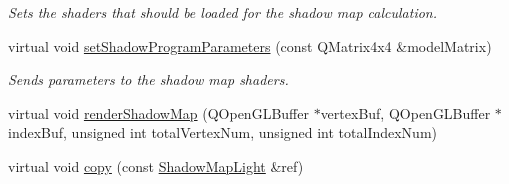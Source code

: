 \begin{DoxyCompactItemize}
\begin{DoxyCompactList}\small\item\em Sets the shaders that should be loaded for the shadow map calculation. \end{DoxyCompactList}\item 
\mbox{\label{class_geometry_engine_1_1_geometry_world_item_1_1_geometry_light_1_1_shadow_map_light_abcc80135c350beeae54a684cf4b61d1e}} 
virtual void \mbox{\hyperlink{class_geometry_engine_1_1_geometry_world_item_1_1_geometry_light_1_1_shadow_map_light_abcc80135c350beeae54a684cf4b61d1e}{set\+Shadow\+Program\+Parameters}} (const Q\+Matrix4x4 \&model\+Matrix)
\begin{DoxyCompactList}\small\item\em Sends parameters to the shadow map shaders. \end{DoxyCompactList}\item 
virtual void \mbox{\hyperlink{class_geometry_engine_1_1_geometry_world_item_1_1_geometry_light_1_1_shadow_map_light_a607026e6ab01948eef922a9370ee35f7}{render\+Shadow\+Map}} (Q\+Open\+G\+L\+Buffer $\ast$vertex\+Buf, Q\+Open\+G\+L\+Buffer $\ast$index\+Buf, unsigned int total\+Vertex\+Num, unsigned int total\+Index\+Num)
\item 
virtual void \mbox{\hyperlink{class_geometry_engine_1_1_geometry_world_item_1_1_geometry_light_1_1_shadow_map_light_a778fdb3b00c8b930e03ebbde77c9433c}{copy}} (const \mbox{\hyperlink{class_geometry_engine_1_1_geometry_world_item_1_1_geometry_light_1_1_shadow_map_light}{Shadow\+Map\+Light}} \&ref)
\end{DoxyCompactItemize}
